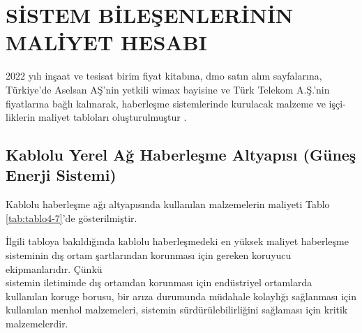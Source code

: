 \section{SİSTEM BİLEŞENLERİNİN MALİYET HESABI}

2022 yılı inşaat ve tesisat birim fiyat kitabına, \gls{dmo} satın alım sayfalarına, Türkiye’de Aselsan AŞ’nin yetkili \gls{wimax} bayisine ve Türk Telekom A.Ş.’nin fiyatlarına bağlı kalınarak, haberleşme sistemlerinde kurulacak malzeme ve işçi-liklerin maliyet tabloları oluşturulmuştur \cite{birimfiyat}.




\subsection{Kablolu Yerel Ağ Haberleşme Altyapısı (Güneş Enerji Sistemi)}


Kablolu haberleşme ağı altyapısında kullanılan malzemelerin maliyeti Tablo \ref{tab:tablo4-7}’de gösterilmiştir.

İlgili tabloya bakıldığında kablolu haberleşmedeki en yüksek maliyet haberleşme sisteminin dış ortam şartlarından korunması için gereken koruyucu ekipmanlarıdır. Çünkü\\ sistemin iletiminde dış ortamdan korunması için endüstriyel ortamlarda kullanılan koruge borusu, bir arıza durumunda müdahale kolaylığı sağlanması için kullanılan menhol malzemeleri, sistemin sürdürülebilirliğini sağlaması için kritik malzemelerdir.


